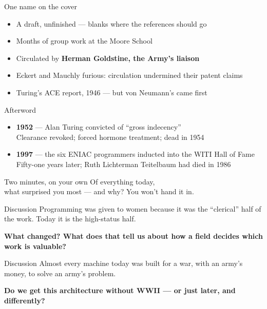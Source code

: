 \documentclass[aspectratio=169,11pt]{beamer}
\newcommand{\thread}[1]{{\color{accent}\bfseries #1}}
\begin{document}
\begin{frame}{One name on the cover}
\Large
\begin{itemize}\setlength\itemsep{1em}
\item A draft, unfinished --- blanks where the references should go
\item Months of group work at the Moore School
\item Circulated by \thread{Herman Goldstine, the Army's liaison}
\item Eckert and Mauchly furious: circulation undermined their patent claims
\item Turing's ACE report, 1946 --- but von Neumann's came first
\end{itemize}
\end{frame}

\begin{frame}{Afterword}
\Large
\begin{itemize}\setlength\itemsep{1.4em}
\item \textbf{1952} --- Alan Turing convicted of ``gross indecency''\\ \large Clearance revoked; forced hormone treatment; dead in 1954
\item \textbf{1997} --- the six ENIAC programmers inducted into the WITI Hall of Fame\\ \large Fifty-one years later; Ruth Lichterman Teitelbaum had died in 1986
\end{itemize}
\end{frame}

\begin{frame}{Two minutes, on your own}
\Huge
\centering
\vfill
Of everything today,\\ what surprised you most --- and why?
\vfill
\large\color{muted} You won't hand it in.
\end{frame}

\begin{frame}{Discussion}
\LARGE
Programming was given to women because it was the ``clerical'' half of the work. Today it is the high-status half.\par\vspace{1.2em}
\thread{What changed? What does that tell us about how a field decides which work is valuable?}
\end{frame}

\begin{frame}{Discussion}
\LARGE
Almost every machine today was built for a war, with an army's money, to solve an army's problem.\par\vspace{1.2em}
\thread{Do we get this architecture without WWII --- or just later, and differently?}
\end{frame}
\end{document}
